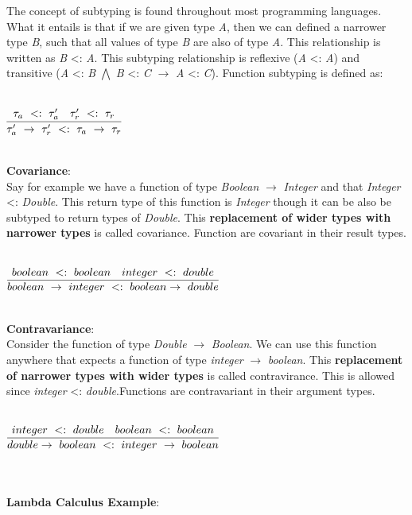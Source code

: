\documentclass[9pt]{extarticle} %
\begin{document}
\begin{minipage}[t]{.52\linewidth} %
\vspace{-0.4cm}
\hypertarget{firstnews}{}

The concept of subtyping is found throughout most programming languages. What it
entails is that if we are given type \textit{A}, then we can defined a narrower
type \textit{B}, such that all values of type \textit{B} are also of type 
\textit{A}. This relationship is written as \textit{B} <: \textit{A}. 
This subtyping relationship is reflexive (\textit{A} <: \textit{A})  and transitive
(\textit{A} <: \textit{B} $\bigwedge$ \textit{B} <: \textit{C} $\rightarrow$
\textit{A} <: \textit{C}). Function subtyping is defined as: \\
\\
\centerline{$\infer{\tau'_a\ \rightarrow\ \tau'_r\ <:\ \tau_a\ \rightarrow\ \tau_r}
	   {\tau_a\ <:\ \tau'_a\ \ \ \tau'_r\ <:\ \tau_r}$}
\\
\textbf{Covariance}: \\
Say for example we have a function of type \textit{Boolean} $\rightarrow$
\textit{Integer} and that \textit{Integer} <: \textit{Double}. This return type
of this function is \textit{Integer} though it can be also be subtyped to return 
types of \textit{Double}. This \textbf{replacement of wider types with narrower
types} is called covariance. Function are covariant in their result types. \\
\\
\centerline{$\infer{boolean\ \rightarrow\ integer\ <:\ boolean \rightarrow\ double}
	   {boolean\ <:\ boolean\ \ \ integer\ <:\ double}$}
\\
\textbf{Contravariance}: \\
Consider the function of type \textit{Double} $\rightarrow$ \textit{Boolean}. We
can use this function anywhere that expects a function of type \textit{integer}
$\rightarrow$ \textit{boolean}. This \textbf{replacement of narrower types with 
wider types} is called contravirance. This is allowed since \textit{integer} <:
\textit{double}.Functions are contravariant in their argument types. \\
\\
\centerline{$\infer{double \rightarrow\ boolean\ <:\ integer\ \rightarrow\ boolean}
	   {integer\ <:\ double\ \ \ boolean\ <:\ boolean}$}
\\
\\
\textbf{Lambda Calculus Example}: \\

\end{minipage}
\end{document}
